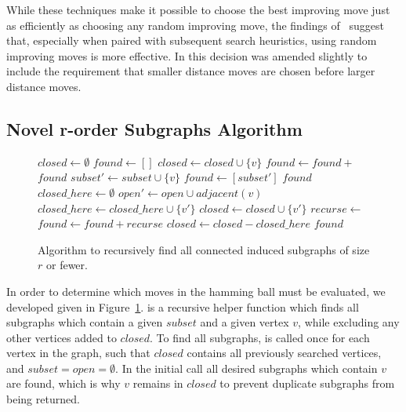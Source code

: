 \documentclass{sig-alternate}
\begin{document}
While these techniques make it possible to choose the best improving move just as efficiently
as choosing any random improving move, the findings of~\cite{whitley:2013:greedy} suggest that,
especially when paired with subsequent search heuristics, using random improving moves is more effective.
In \cite{chicano:2014:ball} this decision was amended slightly to include the requirement that smaller
distance moves are chosen before larger distance moves.

\subsection{Novel r-order Subgraphs Algorithm}
\begin{figure}
  \begin{algorithmic}[1]
    \State $closed \leftarrow \emptyset$
    \State $found \leftarrow []$
      \State $closed \leftarrow closed \cup \{v\}$
      \State $found \leftarrow found + $
    \EndFor
    \State \Return $found$
  \EndProcedure
    \State $subset' \leftarrow subset \cup \{v\}$
    \State $found \leftarrow [subset']$
      \Return $found$
    \EndIf
    \State $closed\_here \leftarrow \emptyset$
    \State $open' \leftarrow open \cup adjacent(v)$
        \State $closed\_here \leftarrow closed\_here \cup \{v'\}$
        \State $closed \leftarrow closed \cup \{v'\}$
        \State $recurse \leftarrow $
        \State $found \leftarrow found + recurse$
    \EndFor
    \State $closed \leftarrow closed - closed\_here$
    \State \Return $found$
  \EndProcedure
\end{algorithmic}
  \caption{Algorithm to recursively find all connected induced subgraphs of size $r$ or fewer.}
  \label{fig-connected-subgraphs}
\end{figure}

In order to determine which moves in the hamming ball must be evaluated,
we developed  given in Figure~\ref{fig-connected-subgraphs}.
 is a recursive helper function which finds all subgraphs
which contain a given $subset$ and a given vertex $v$, while excluding
any other vertices added to $closed$. To find all subgraphs, 
is called once for each vertex in the graph, such that $closed$ contains
all previously searched vertices, and $subset=open=\emptyset$. In the initial
call all desired subgraphs which contain $v$ are found, which is why $v$ remains
in $closed$ to prevent duplicate subgraphs from being returned.
\end{document}
